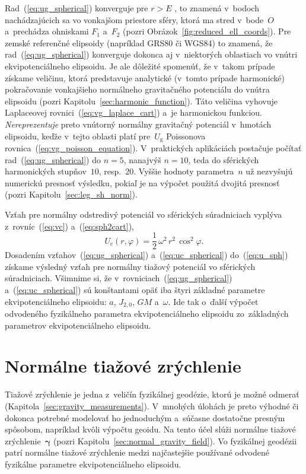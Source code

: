 \documentclass[a4paper, 12pt]{book}
\newcommand{\gidx}{\mathrm g}
\newcommand{\cidx}{\mathrm c}
\begin{document}
Rad~(\ref{eq:ug_spherical}) konverguje pre $r > E$ 
\parencite{MoritzAdvancedGeodesy}, to znamená v~bodoch nachádzajúcich sa vo 
vonkajšom priestore sféry, ktorá ma stred v~bode~$O$ a~prechádza ohniskami 
$F_1$ a~$F_2$ (pozri Obrázok~\ref{fig:reduced_ell_coords}).  Pre zemské 
referenčné elipsoidy (napríklad GRS80 či WGS84) to znamená, že 
rad~(\ref{eq:ug_spherical}) konverguje dokonca aj v~niektorých oblastiach vo 
vnútri ekvipotenciálneho elipsoidu.  Je ale dôležité spomenúť, že v~takom 
prípade získame veličinu, ktorá predstavuje analytické (v~tomto prípade 
harmonické) pokračovanie vonkajšieho normálneho gravitačného potenciálu do 
vnútra elipsoidu (pozri Kapitolu~\ref{sec:harmonic_function}).  Táto veličina 
vyhovuje Laplaceovej rovnici~(\ref{eq:vg_laplace_cart}) a~je harmonickou 
funkciou.  \emph{Nereprezentuje} preto vnútorný normálny gravitačný potenciál 
v~hmotách elipsoidu, keďže v~tejto oblasti platí pre~$U_\gidx$ Poissonova 
rovnica~(\ref{eq:vg_poisson_equation}).  V~praktických aplikáciách postačuje 
počítať rad~(\ref{eq:ug_spherical}) do $n = 5$, nanajvýš $n = 10$, teda do 
sférických harmonických stupňov~$10$, resp.~$20$.  Vyššie hodnoty parametra~$n$ 
už nezvyšujú numerickú presnosť výsledku, pokiaľ je na výpočet použitá dvojitá 
presnosť (pozri Kapitolu~\ref{sec:leg_sh_norm}).

Vzťah pre normálny odstredivý potenciál vo sférických súradniciach vyplýva 
z~rovníc~(\ref{eq:vc}) a~(\ref{eq:sph2cart}),
%
\begin{equation}
\label{eq:uc_spherical}
U_\cidx(r, \varphi) = \frac{1}{2} \, \omega^2 \, r^2 \, \cos^2\varphi{.}
\end{equation}
%
Dosadením vzťahov~(\ref{eq:ug_spherical}) a~(\ref{eq:uc_spherical}) 
do~(\ref{eq:u_sph}) získame výsledný vzťah pre normálny tiažový potenciál vo 
sférických súradniciach.  Všimnime si, že v~rovniciach~(\ref{eq:ug_spherical}) 
a~(\ref{eq:uc_spherical}) sú konštantami opäť iba štyri základné parametre 
ekvipotenciálneho elipsoidu: $a$, $J_{2,0}$, $GM$ a~$\omega$.  Ide tak o~ďalší 
výpočet odvodeného fyzikálneho parametra ekvipotenciálneho elipsoidu 
zo~základných parametrov ekvipotenciálneho elipsoidu.



\section{Normálne tiažové zrýchlenie}
\label{sec:normal_gravity}

Tiažové zrýchlenie je jedna z~veličín fyzikálnej geodézie, ktorú je možné 
odmerať (Kapitola~\ref{sec:gravity_measurements}).  V~mnohých úlohách je preto 
výhodné či dokonca potrebné modelovať ho jednoduchým a~súčasne dostatočne 
presným spôsobom, napríklad kvôli výpočtu geoidu.  Na tento účel slúži normálne 
tiažové zrýchlenie~$\boldsymbol\gamma$ (pozri 
Kapitolu~\ref{sec:normal_gravity_field}).  Vo fyzikálnej geodézii patrí 
normálne tiažové zrýchlenie medzi najčastejšie používané odvodené fyzikálne 
parametre ekvipotenciálneho elipsoidu.
\end{document}
